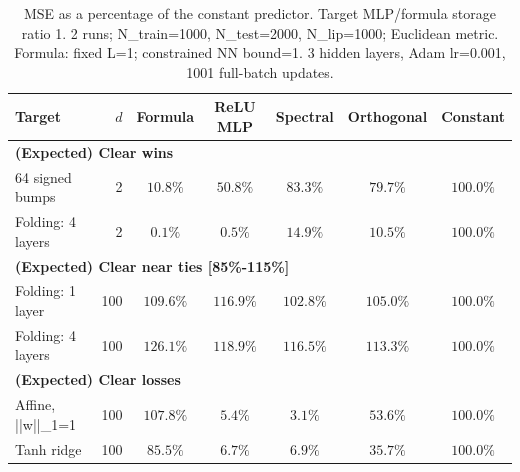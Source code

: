 \documentclass{article}
\begin{document}
\begin{table}[t]
\centering
\scriptsize
\setlength{\tabcolsep}{3pt}
\caption{MSE as a percentage of the constant predictor. Target MLP/formula storage ratio 1. 2 runs; N\_train=1000, N\_test=2000, N\_lip=1000; Euclidean metric. Formula: fixed L=1; constrained NN bound=1. 3 hidden layers, Adam lr=0.001, 1001 full-batch updates.}
\begin{tabular}{lrccccc}
\hline
Target & $d$ & Formula & ReLU MLP & Spectral & Orthogonal & Constant \\
\hline
\multicolumn{7}{l}{\textbf{(Expected) Clear wins}} \\
64 signed bumps & 2 & $10.8\%$ & $50.8\%$ & $83.3\%$ & $79.7\%$ & $100.0\%$ \\
Folding: 4 layers & 2 & $0.1\%$ & $0.5\%$ & $14.9\%$ & $10.5\%$ & $100.0\%$ \\
\hline
\multicolumn{7}{l}{\textbf{(Expected) Clear near ties [85\%-115\%]}} \\
Folding: 1 layer & 100 & $109.6\%$ & $116.9\%$ & $102.8\%$ & $105.0\%$ & $100.0\%$ \\
Folding: 4 layers & 100 & $126.1\%$ & $118.9\%$ & $116.5\%$ & $113.3\%$ & $100.0\%$ \\
\hline
\multicolumn{7}{l}{\textbf{(Expected) Clear losses}} \\
Affine, ||w||\_1=1 & 100 & $107.8\%$ & $5.4\%$ & $3.1\%$ & $53.6\%$ & $100.0\%$ \\
Tanh ridge & 100 & $85.5\%$ & $6.7\%$ & $6.9\%$ & $35.7\%$ & $100.0\%$ \\
\hline
\end{tabular}
\end{table}
\clearpage
\end{document}
